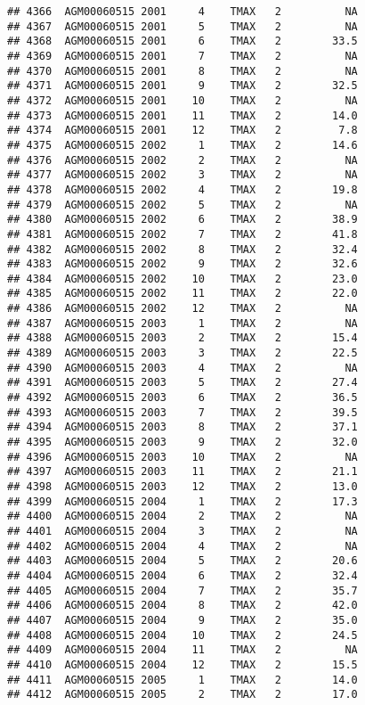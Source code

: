 \documentclass{article}\usepackage[]{graphicx}\usepackage[]{color}
\makeatletter
\newenvironment{kframe}{%
 \def\at@end@of@kframe{}%
 \ifinner\ifhmode%
  \def\at@end@of@kframe{\end{minipage}}%
  \begin{minipage}{\columnwidth}%
 \fi\fi%
 \def\FrameCommand##1{\hskip\@totalleftmargin \hskip-\fboxsep
 \colorbox{shadecolor}{##1}\hskip-\fboxsep
     \hskip-\linewidth \hskip-\@totalleftmargin \hskip\columnwidth}%
 \MakeFramed {\advance\hsize-\width
   \@totalleftmargin\z@ \linewidth\hsize
   \@setminipage}}%
 {\par\unskip\endMakeFramed%
 \at@end@of@kframe}
\newenvironment{knitrout}{}{} %
\makeatother
\begin{document}
\begin{knitrout}
\begin{kframe}
\begin{verbatim}
## 4366  AGM00060515 2001     4    TMAX   2          NA
## 4367  AGM00060515 2001     5    TMAX   2          NA
## 4368  AGM00060515 2001     6    TMAX   2        33.5
## 4369  AGM00060515 2001     7    TMAX   2          NA
## 4370  AGM00060515 2001     8    TMAX   2          NA
## 4371  AGM00060515 2001     9    TMAX   2        32.5
## 4372  AGM00060515 2001    10    TMAX   2          NA
## 4373  AGM00060515 2001    11    TMAX   2        14.0
## 4374  AGM00060515 2001    12    TMAX   2         7.8
## 4375  AGM00060515 2002     1    TMAX   2        14.6
## 4376  AGM00060515 2002     2    TMAX   2          NA
## 4377  AGM00060515 2002     3    TMAX   2          NA
## 4378  AGM00060515 2002     4    TMAX   2        19.8
## 4379  AGM00060515 2002     5    TMAX   2          NA
## 4380  AGM00060515 2002     6    TMAX   2        38.9
## 4381  AGM00060515 2002     7    TMAX   2        41.8
## 4382  AGM00060515 2002     8    TMAX   2        32.4
## 4383  AGM00060515 2002     9    TMAX   2        32.6
## 4384  AGM00060515 2002    10    TMAX   2        23.0
## 4385  AGM00060515 2002    11    TMAX   2        22.0
## 4386  AGM00060515 2002    12    TMAX   2          NA
## 4387  AGM00060515 2003     1    TMAX   2          NA
## 4388  AGM00060515 2003     2    TMAX   2        15.4
## 4389  AGM00060515 2003     3    TMAX   2        22.5
## 4390  AGM00060515 2003     4    TMAX   2          NA
## 4391  AGM00060515 2003     5    TMAX   2        27.4
## 4392  AGM00060515 2003     6    TMAX   2        36.5
## 4393  AGM00060515 2003     7    TMAX   2        39.5
## 4394  AGM00060515 2003     8    TMAX   2        37.1
## 4395  AGM00060515 2003     9    TMAX   2        32.0
## 4396  AGM00060515 2003    10    TMAX   2          NA
## 4397  AGM00060515 2003    11    TMAX   2        21.1
## 4398  AGM00060515 2003    12    TMAX   2        13.0
## 4399  AGM00060515 2004     1    TMAX   2        17.3
## 4400  AGM00060515 2004     2    TMAX   2          NA
## 4401  AGM00060515 2004     3    TMAX   2          NA
## 4402  AGM00060515 2004     4    TMAX   2          NA
## 4403  AGM00060515 2004     5    TMAX   2        20.6
## 4404  AGM00060515 2004     6    TMAX   2        32.4
## 4405  AGM00060515 2004     7    TMAX   2        35.7
## 4406  AGM00060515 2004     8    TMAX   2        42.0
## 4407  AGM00060515 2004     9    TMAX   2        35.0
## 4408  AGM00060515 2004    10    TMAX   2        24.5
## 4409  AGM00060515 2004    11    TMAX   2          NA
## 4410  AGM00060515 2004    12    TMAX   2        15.5
## 4411  AGM00060515 2005     1    TMAX   2        14.0
## 4412  AGM00060515 2005     2    TMAX   2        17.0

\end{verbatim}
\end{kframe}
\end{knitrout}
\end{document}

